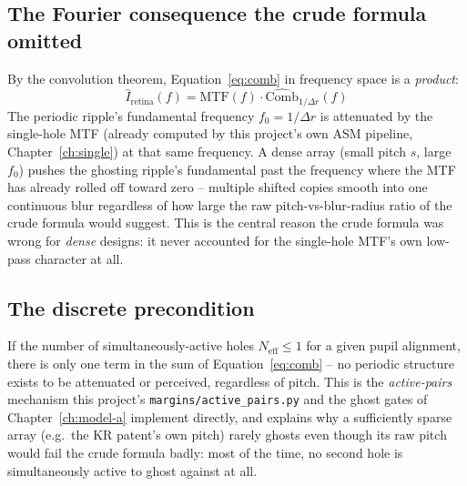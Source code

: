 \subsection{The Fourier consequence the crude formula omitted}
By the convolution theorem, Equation~\ref{eq:comb} in frequency space is a
\emph{product}:
\begin{equation}
\hat{I}_{\mathrm{retina}}(f) = \mathrm{MTF}(f)\cdot\hat{\mathrm{Comb}}_{1/\Delta r}(f)
\end{equation}
The periodic ripple's fundamental frequency $f_0=1/\Delta r$ is attenuated by the
single-hole MTF (already computed by this project's own ASM pipeline,
Chapter~\ref{ch:single}) at that same frequency. A dense array (small pitch $s$, large
$f_0$) pushes the ghosting ripple's fundamental past the frequency where the MTF has
already rolled off toward zero -- multiple shifted copies smooth into one continuous
blur regardless of how large the raw pitch-vs-blur-radius ratio of the crude formula
would suggest. This is the central reason the crude formula was wrong for \emph{dense}
designs: it never accounted for the single-hole MTF's own low-pass character at all.

\subsection{The discrete precondition}
If the number of simultaneously-active holes $N_{\mathrm{eff}}\le1$ for a given pupil
alignment, there is only one term in the sum of Equation~\ref{eq:comb} -- no periodic
structure exists to be attenuated or perceived, regardless of pitch. This is the
\emph{active-pairs} mechanism this project's \texttt{margins/active\_pairs.py} and the
ghost gates of Chapter~\ref{ch:model-a} implement directly, and explains why a
sufficiently sparse array (e.g.\ the KR patent's own pitch) rarely ghosts even though
its raw pitch would fail the crude formula badly: most of the time, no second hole is
simultaneously active to ghost against at all.

